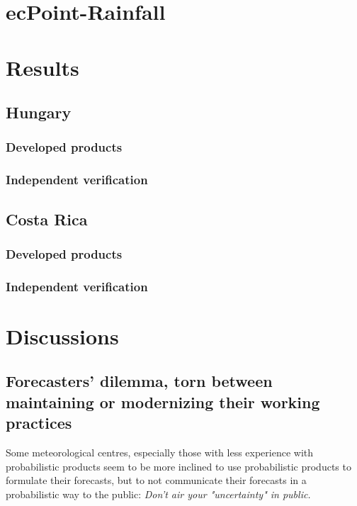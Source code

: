 


\section{ecPoint-Rainfall}




\section{Results}
\subsection{Hungary}
\subsubsection{Developed products}
\subsubsection{Independent verification}
\subsection{Costa Rica}
\subsubsection{Developed products}
\subsubsection{Independent verification}


\section{Discussions}


\subsection{Forecasters' dilemma, torn between maintaining or modernizing their working practices}
Some meteorological centres, especially those with less experience with probabilistic products seem to be more inclined to use probabilistic products to formulate their forecasts, but to not communicate their forecasts in a probabilistic way to the public: \textit{Don't air your "uncertainty" in public.} \citep{jimenez2020}

